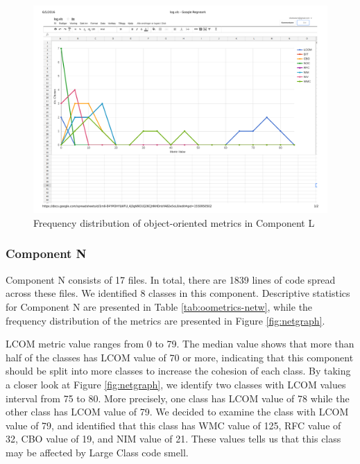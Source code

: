 \begin{landscape}
\setlength\LTleft{-.5in}
	\begin{figure}
	\centering
	\includegraphics[width=\textwidth]{images/pdf/log.pdf}
	\caption{Frequency distribution of object-oriented metrics in Component L}
	\label{fig:loggraph}
	\end{figure}
\end{landscape}







\subsubsection{Component N}
Component N consists of 17 files. In total, there are 1839 lines of code spread across these files. We identified 8 classes in this component. Descriptive statistics for Component N are presented in Table \ref{tab:oometrics-netw}, while the frequency distribution of the metrics are presented in Figure \ref{fig:netgraph}.

LCOM metric value ranges from 0 to 79. The median value shows that more than half of the classes has LCOM value of 70 or more, indicating that this component should be split into more classes to increase the cohesion of each class. By taking a closer look at Figure \ref{fig:netgraph}, we identify two classes with LCOM values interval from 75 to 80. More precisely, one class has LCOM value of 78 while the other class has LCOM value of 79. We decided to examine the class with LCOM value of 79, and identified that this class has WMC value of 125, RFC value of 32, CBO value of 19, and NIM value of 21. These values tells us that this class may be affected by Large Class code smell.


